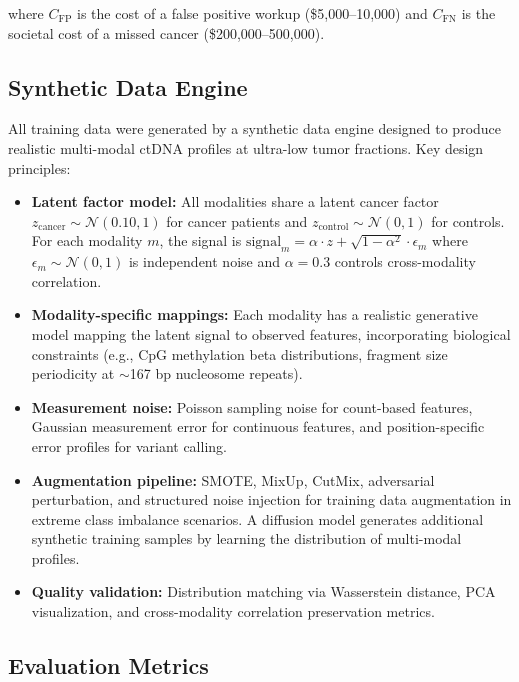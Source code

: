 \documentclass[10pt,a4paper]{article}
\begin{document}
where $C_{\text{FP}}$ is the cost of a false positive workup (\$5,000--10,000) and $C_{\text{FN}}$ is the societal cost of a missed cancer (\$200,000--500,000).

\subsection{Synthetic Data Engine}

All training data were generated by a synthetic data engine designed to produce realistic multi-modal ctDNA profiles at ultra-low tumor fractions. Key design principles:

\begin{itemize}
\item \textbf{Latent factor model:} All modalities share a latent cancer factor $z_{\text{cancer}} \sim \mathcal{N}(0.10, 1)$ for cancer patients and $z_{\text{control}} \sim \mathcal{N}(0, 1)$ for controls. For each modality $m$, the signal is $\text{signal}_m = \alpha \cdot z + \sqrt{1-\alpha^2} \cdot \epsilon_m$ where $\epsilon_m \sim \mathcal{N}(0, 1)$ is independent noise and $\alpha = 0.3$ controls cross-modality correlation.
\item \textbf{Modality-specific mappings:} Each modality has a realistic generative model mapping the latent signal to observed features, incorporating biological constraints (e.g., CpG methylation beta distributions, fragment size periodicity at $\sim$167 bp nucleosome repeats).
\item \textbf{Measurement noise:} Poisson sampling noise for count-based features, Gaussian measurement error for continuous features, and position-specific error profiles for variant calling.
\item \textbf{Augmentation pipeline:} SMOTE, MixUp, CutMix, adversarial perturbation, and structured noise injection for training data augmentation in extreme class imbalance scenarios. A diffusion model generates additional synthetic training samples by learning the distribution of multi-modal profiles.
\item \textbf{Quality validation:} Distribution matching via Wasserstein distance, PCA visualization, and cross-modality correlation preservation metrics.
\end{itemize}

\subsection{Evaluation Metrics}
\end{document}
